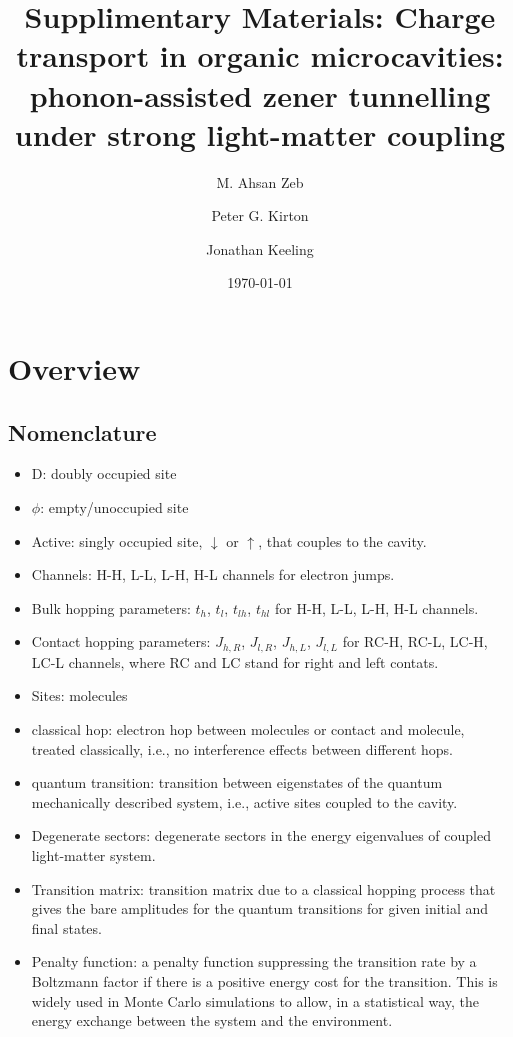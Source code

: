 \documentclass[a4paper]{revtex4-1} %
\newcommand{\da}{\downarrow}
\newcommand{\ua}{\uparrow}
\begin{document}
\title{Supplimentary Materials: Charge transport in organic microcavities: phonon-assisted zener tunnelling under strong light-matter coupling}

\author{M. Ahsan Zeb}
\author{Peter G. Kirton}
\author{Jonathan Keeling}
\date{\today}

\begin{abstract}
\end{abstract}

\section{Overview}

\subsection{Nomenclature}
\begin{itemize}
\item D: doubly occupied site
\item $\phi$: empty/unoccupied site
\item Active: singly occupied site, $\da$ or $\ua$, that couples to the cavity.
\item Channels: H-H, L-L, L-H, H-L channels for electron jumps.
\item Bulk hopping parameters: $t_h$, $t_l$, $t_{lh}$, $t_{hl}$ for H-H, L-L, L-H, H-L channels.
\item Contact hopping parameters: $J_{h,R}$, $J_{l,R}$, $J_{h,L}$, $J_{l,L}$ for RC-H, RC-L, LC-H, LC-L channels, where RC and LC stand for right and left contats.
\item Sites: molecules
\item classical hop: electron hop between molecules or contact and molecule, treated classically, i.e., no interference effects between different hops.
\item quantum transition: transition between eigenstates of the quantum mechanically described system, i.e., active sites coupled to the cavity.
\item Degenerate sectors: degenerate sectors in the energy eigenvalues of coupled light-matter system. 
\item Transition matrix: transition matrix due to a classical hopping process 
that gives the bare amplitudes for the quantum transitions for given initial and final states.
\item Penalty function: a penalty function suppressing the transition rate by a Boltzmann factor if there is a positive energy cost for the transition. This is widely used in Monte Carlo simulations to allow, in a statistical way, the energy exchange between the system and the environment. 
\end{itemize}
\end{document}
